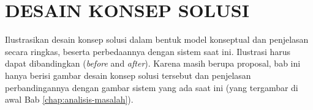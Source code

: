 \chapter{DESAIN KONSEP SOLUSI}
\label{chap:desain-konsep-solusi}
Ilustrasikan desain konsep solusi dalam bentuk model konseptual dan penjelasan secara ringkas, 
beserta perbedaannya dengan sistem saat ini. Ilustrasi harus dapat dibandingkan (\textit{before} and \textit{after}). 
Karena masih berupa proposal, bab ini hanya berisi gambar desain konsep solusi tersebut dan 
penjelasan perbandingannya dengan gambar sistem yang ada saat ini (yang tergambar di awal Bab \ref{chap:analisis-masalah}).